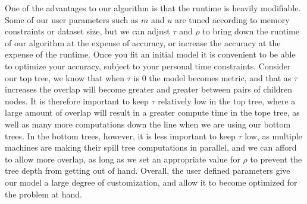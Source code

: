 One of the advantages to our algorithm is that the runtime is heavily 
modifiable.  Some of our user parameters such as $m$ and $u$ are tuned according
to memory constraints or dataset size, but we can adjust $\tau$ and $\rho$ to 
bring down the runtime of our algorithm at the expense of accuracy, or increase 
the accuracy at the expense of the runtime.  Once you fit an initial model it is 
convenient to be able to optimize your accuracy, subject to your personal time 
constraints.  Consider our top tree, we know that when $\tau$ is 0 the model 
becomes metric, and that as $\tau$ increases the overlap will become greater and 
greater between pairs of children nodes.  It is therefore important to keep 
$\tau$ relatively low in the top tree, where a large amount of overlap will 
result in a greater compute time in the tope tree, as well as many more 
computations down the line when we are using our bottom trees.  In the bottom 
trees, however, it is less important to keep $\tau$ low, as multiple machines 
are making their spill tree computations in parallel, and we can afford to allow 
more overlap, as long as we set an appropriate value for $\rho$ to prevent the 
tree depth from getting out of hand.  Overall, the user defined parameters give 
our model a large degree of customization, and allow it to become optimized for 
the problem at hand.